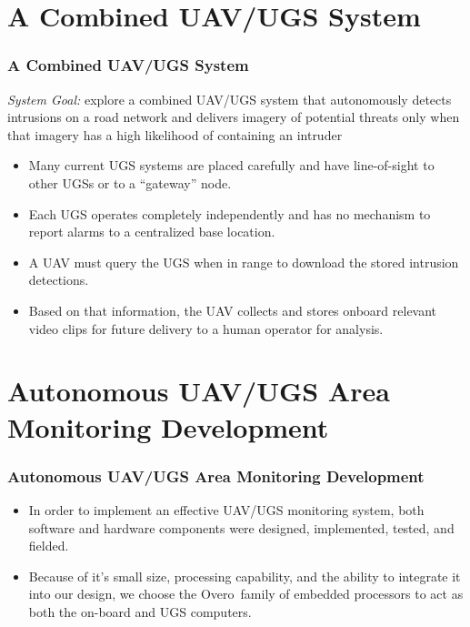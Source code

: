 \documentclass{beamer}
\DeclareRobustCommand{\overo}{Overo\textsuperscript{\textregistered}}
\begin{document}
\section{A Combined UAV/UGS System} 
\begin{frame}\frametitle{A Combined UAV/UGS System} 
\emph{System Goal:} explore a combined UAV/UGS system that autonomously detects intrusions on a road network and delivers imagery of potential threats only when that imagery has a high likelihood of containing an intruder
\begin{itemize}
\item Many current UGS systems are placed carefully and have line-of-sight to other UGSs or to a “gateway” node.
\item Each UGS operates completely independently and has no mechanism to report alarms to a centralized base location. 
\item A UAV must query the UGS when in range to download the stored intrusion detections.
\item Based on that information, the UAV collects and stores onboard relevant video clips for future delivery to a human operator for analysis.
\end{itemize}
\end{frame}

\section{Autonomous UAV/UGS Area Monitoring Development} \label{sec:hardware}
\begin{frame}\frametitle{Autonomous UAV/UGS Area Monitoring Development} 
%
\begin{itemize}
\item In order to implement an effective UAV/UGS monitoring system, both software and hardware components were designed, implemented, tested, and fielded.\\
\item Because of it's small size, processing capability, and the ability to integrate it into our design, we choose the \overo ~family of embedded processors to act as both the on-board and UGS computers.
\end{itemize}
\end{frame}
\end{document}
